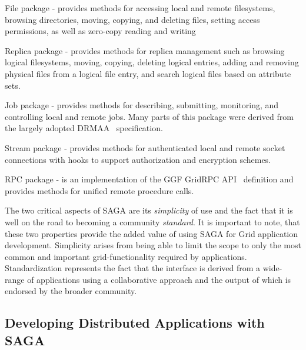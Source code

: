 \documentclass[conference,final]{IEEEtran}
\newcommand{\up}{\vspace*{-1em}}
\begin{document}
\begin{compactitem}
\item File package - provides methods for accessing local and remote
  filesystems, browsing directories, moving, copying, and deleting
  files, setting access permissions, as well as zero-copy reading and
  writing
\item Replica package - provides methods for replica management such
  as browsing logical filesystems, moving, copying, deleting logical
  entries, adding and removing physical files from a logical file
  entry, and search logical files based on attribute sets.
\item Job package - provides methods for describing, submitting,
  monitoring, and controlling local and remote jobs. Many parts of
  this package were derived from the largely adopted
  DRMAA~\cite{drmaa_url} specification.
\item Stream package - provides methods for authenticated local and
  remote socket connections with hooks to support authorization and
  encryption schemes.
\item RPC package - is an implementation of the GGF GridRPC
  API~\cite{gridrpc_url} definition and provides methods for unified
  remote procedure calls.
\end{compactitem}

The two critical aspects of SAGA are its {\it simplicity} of use and
the fact that it is well on the road to becoming a community {\it
  standard}.  It is important to note, that these two properties
provide the added value of using SAGA for Grid application
development.  Simplicity arises from being able to limit the scope to
only the most common and important grid-functionality required by
applications.  Standardization represents the fact that the interface
is derived from a wide-range of applications using a collaborative
approach and the output of which is endorsed by the broader community.

\up

\subsection{Developing Distributed Applications with SAGA}

\up
\end{document}
